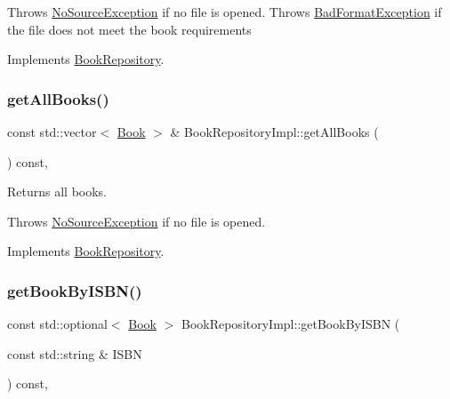 Throws \hyperlink{structNoSourceException}{No\+Source\+Exception} if no file is opened. Throws \hyperlink{structBadFormatException}{Bad\+Format\+Exception} if the file does not meet the book requirements 

Implements \hyperlink{classBookRepository_a0019e716ba40e39d2ef01e639347e8f9}{Book\+Repository}.

\mbox{\label{classBookRepositoryImpl_aa3603924efed4ec623235193d2350569}} 
\subsubsection{\texorpdfstring{get\+All\+Books()}{getAllBooks()}}
{\footnotesize\ttfamily const std\+::vector$<$ \hyperlink{classBook}{Book} $>$ \& Book\+Repository\+Impl\+::get\+All\+Books (\begin{DoxyParamCaption}{ }\end{DoxyParamCaption}) const\hspace{0.3cm}{\ttfamily [override]}, {\ttfamily [virtual]}}

Returns all books.

Throws \hyperlink{structNoSourceException}{No\+Source\+Exception} if no file is opened. 

Implements \hyperlink{classBookRepository_a4cc8b9c8427d4ef32cd671b87a0d17b0}{Book\+Repository}.

\mbox{\label{classBookRepositoryImpl_ab41594acd9ec505c0eaa048fa1ae2c19}} 
\subsubsection{\texorpdfstring{get\+Book\+By\+I\+S\+B\+N()}{getBookByISBN()}}
{\footnotesize\ttfamily const std\+::optional$<$ \hyperlink{classBook}{Book} $>$ Book\+Repository\+Impl\+::get\+Book\+By\+I\+S\+BN (\begin{DoxyParamCaption}\item[{const std\+::string \&}]{I\+S\+BN }\end{DoxyParamCaption}) const\hspace{0.3cm}{\ttfamily [override]}, {\ttfamily [virtual]}}

